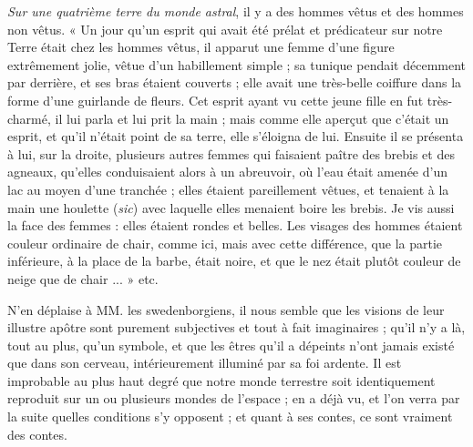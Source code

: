 \documentclass[a4paper, 11pt, oneside, landscape]{article}
\begin{document}
\emph{Sur une quatrième terre du monde astral}, il y a des hommes vêtus et des hommes non vêtus. « Un jour qu'un esprit qui avait été prélat et prédicateur sur notre Terre était chez les hommes vêtus, il apparut une femme d'une figure extrêmement jolie, vêtue d'un habillement simple ; sa tunique pendait décemment par derrière, et ses bras étaient couverts ; elle avait une très-belle coiffure dans la forme d'une guirlande de fleurs. Cet esprit ayant vu cette jeune fille en fut très-charmé, il lui parla et lui prit la main ; mais comme elle aperçut que c'était un esprit, et qu'il n'était point de sa terre, elle s'éloigna de lui. Ensuite il se présenta à lui, sur la droite, plusieurs autres femmes qui faisaient paître des brebis et des agneaux, qu'elles conduisaient alors à un abreuvoir, où l'eau était amenée d'un lac au moyen d'une tranchée ; elles étaient pareillement vêtues, et tenaient à la main une houlette (\emph{sic}) avec laquelle elles menaient boire les brebis. Je vis aussi la face des femmes : elles étaient rondes et belles. Les visages des hommes étaient couleur ordinaire de chair, comme ici, mais avec cette différence, que la partie inférieure, à la place de la barbe, était noire, et que le nez était plutôt couleur de neige que de chair ... » etc.

N'en déplaise à MM. les swedenborgiens, il nous semble que les visions de leur illustre apôtre sont purement subjectives et tout à fait imaginaires ; qu'il n'y a là, tout au plus, qu'un symbole, et que les êtres qu'il a dépeints n'ont jamais existé que dans son cerveau, intérieurement illuminé par sa foi ardente. Il est improbable au plus haut degré que notre monde terrestre soit identiquement reproduit sur un ou plusieurs mondes de l'espace ; en a déjà vu, et l'on verra par la suite quelles conditions s'y opposent ; et quant à ses contes, ce sont vraiment des contes.
\end{document}
